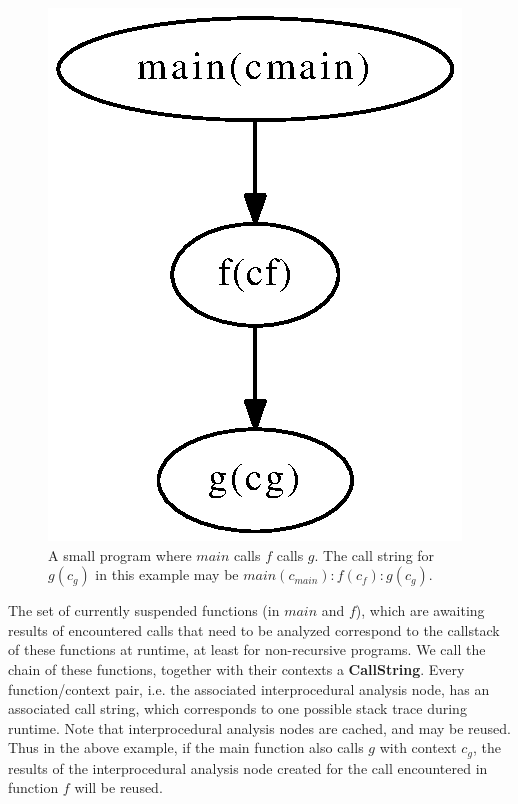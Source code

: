 \begin{figure}[htbp]
\begin{center}
\includegraphics[scale=.6]{Figures/callstring.eps}
\caption[A small program where $main$ calls $f$ calls $g$.]{
A small program where $main$ calls $f$ calls $g$. The call string
for $g(c_g)$ in this example may be $main(c_{main}) : f(c_f) : g(c_g)$.
}
\label{Fig:callstring}
\end{center}
\end{figure}


The set of currently suspended functions (in 
$main$ and $f$), which are awaiting results of encountered calls that
need to be analyzed correspond to the callstack of these functions at
runtime, at least for non-recursive programs. We call the chain of
these functions, together with their contexts a \textbf{ CallString}. Every
function/context pair, i.e. the associated interprocedural analysis
node, has an associated call string, which corresponds to one possible
stack trace during runtime.  Note that interprocedural analysis nodes
are cached, and may be reused. Thus in the above example, if the main
function also calls $g$ with context $c_g$, the results of the
interprocedural analysis node created for the call encountered in
function $f$ will be reused.


